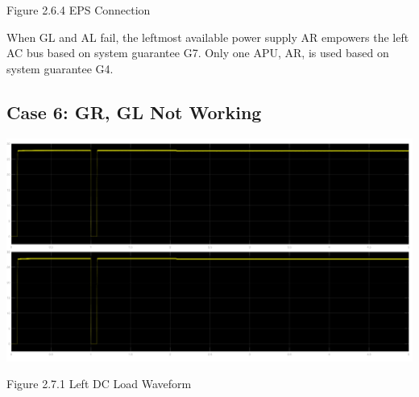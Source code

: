 \documentclass{mcmthesis}
\begin{document}
\begin{center}
\small{Figure 2.6.4 EPS Connection}
\end{center}
When GL and AL fail,  the leftmost available power supply AR empowers the left AC bus based on system guarantee G7. Only one APU, AR, is used based on system guarantee G4.
\pagebreak

\subsection{Case 6: GR, GL Not Working}
\begin{center}
\includegraphics[trim= 0 0.28\imageheight{} 0 0, clip, width = 0.165\imageheight{}]{gl_gr_load1.png}
\end{center}
\begin{center}
\small{Figure 2.7.1 Left DC Load Waveform}
\end{center}
\end{document}
